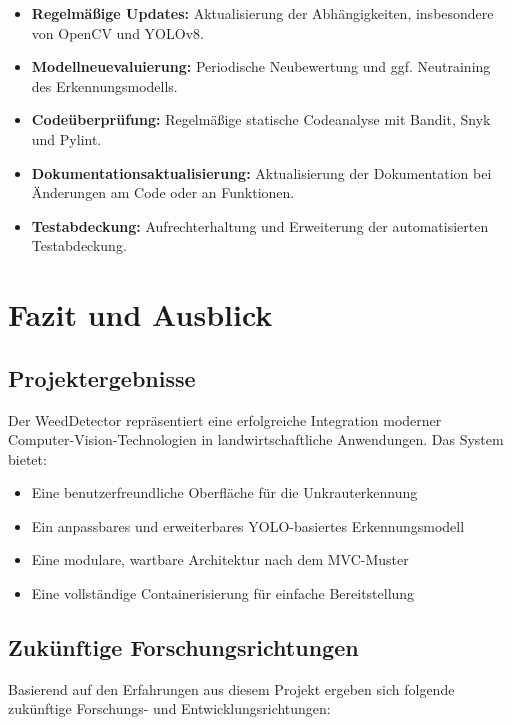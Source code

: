 \documentclass[12pt, a4paper]{scrreprt}
\begin{document}
\begin{itemize}
    \item \textbf{Regelmäßige Updates:} Aktualisierung der Abhängigkeiten, insbesondere von OpenCV und YOLOv8.
    \item \textbf{Modellneuevaluierung:} Periodische Neubewertung und ggf. Neutraining des Erkennungsmodells.
    \item \textbf{Codeüberprüfung:} Regelmäßige statische Codeanalyse mit Bandit, Snyk und Pylint.
    \item \textbf{Dokumentationsaktualisierung:} Aktualisierung der Dokumentation bei Änderungen am Code oder an Funktionen.
    \item \textbf{Testabdeckung:} Aufrechterhaltung und Erweiterung der automatisierten Testabdeckung.
\end{itemize}

\chapter{Fazit und Ausblick}

\section{Projektergebnisse}
Der WeedDetector repräsentiert eine erfolgreiche Integration moderner Computer-Vision-Technologien in landwirtschaftliche Anwendungen. Das System bietet:

\begin{itemize}
    \item Eine benutzerfreundliche Oberfläche für die Unkrauterkennung
    \item Ein anpassbares und erweiterbares YOLO-basiertes Erkennungsmodell
    \item Eine modulare, wartbare Architektur nach dem MVC-Muster
    \item Eine vollständige Containerisierung für einfache Bereitstellung
\end{itemize}

\section{Zukünftige Forschungsrichtungen}
Basierend auf den Erfahrungen aus diesem Projekt ergeben sich folgende zukünftige Forschungs- und Entwicklungsrichtungen:
\end{document}
